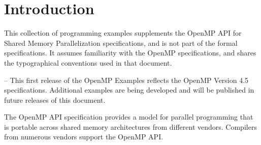 %
%
%
%
%
%
%
%
%
%

\chapter*{Introduction}
\label{chap:introduction}
This collection of programming examples supplements the OpenMP API for Shared
Memory Parallelization specifications, and is not part of the formal specifications. It
assumes familiarity with the OpenMP specifications, and shares the typographical
conventions used in that document.

\notestart
\noteheader – This first release of the OpenMP Examples reflects the OpenMP Version 4.5
specifications. Additional examples are being developed and will be published in future
releases of this document.
\noteend

The OpenMP API specification provides a model for parallel programming that is
portable across shared memory architectures from different vendors. Compilers from
numerous vendors support the OpenMP API.

